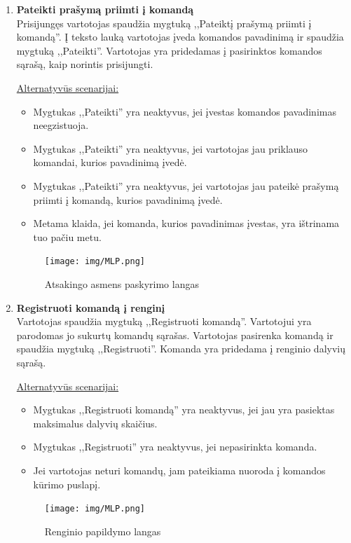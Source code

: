 \documentclass{VUMIFPSkursinis}
\begin{document}
\begin{enumerate} [label = \textbf{U\arabic*.}]
			\item \textbf{Pateikti prašymą priimti į komandą} \\
				Prisijungęs vartotojas spaudžia mygtuką ,,Pateiktį prašymą priimti į komandą''. Į teksto lauką vartotojas įveda komandos pavadinimą ir spaudžia mygtuką ,,Pateikti''. Vartotojas yra pridedamas į pasirinktos komandos sąrašą, kaip norintis prisijungti.
				
				\underline{Alternatyvūs scenarijai:}
				\begin{itemize}
					\item Mygtukas ,,Pateikti'' yra neaktyvus, jei įvestas komandos pavadinimas neegzistuoja.
					\item Mygtukas ,,Pateikti'' yra neaktyvus, jei vartotojas jau priklauso komandai, kurios pavadinimą įvedė.
					\item Mygtukas ,,Pateikti'' yra neaktyvus, jei vartotojas jau pateikė prašymą priimti į komandą, kurios pavadinimą įvedė.
					\item Metama klaida, jei komanda, kurios pavadinimas įvestas, yra ištrinama tuo pačiu metu.
				\end{itemize}
				
				\begin{figure}[H]
					\centering
					\texttt{[image: img/MLP.png]}
					\caption{Atsakingo asmens paskyrimo langas}
					\label{fig:paskirti-atsakinga-asmeni}
				\end{figure}
				
			\item \textbf{Registruoti komandą į renginį} \\
				Vartotojas spaudžia mygtuką ,,Registruoti komandą''. Vartotojui yra parodomas jo sukurtų komandų sąrašas. Vartotojas pasirenka komandą ir spaudžia mygtuką ,,Registruoti''. Komanda yra pridedama į renginio dalyvių sąrašą.
				
				\underline{Alternatyvūs scenarijai:}
				\begin{itemize}
					\item Mygtukas ,,Registruoti komandą'' yra neaktyvus, jei jau yra pasiektas maksimalus dalyvių skaičius.
					\item Mygtukas ,,Registruoti'' yra neaktyvus, jei nepasirinkta komanda.
					\item Jei vartotojas neturi komandų, jam pateikiama nuoroda į komandos kūrimo puslapį.
				\end{itemize}
				
				\begin{figure}[H]
					\centering
					\texttt{[image: img/MLP.png]}
					\caption{Renginio papildymo langas}
					\label{fig:prideti-aprasa}
				\end{figure}
				

\end{enumerate}
\end{document}
